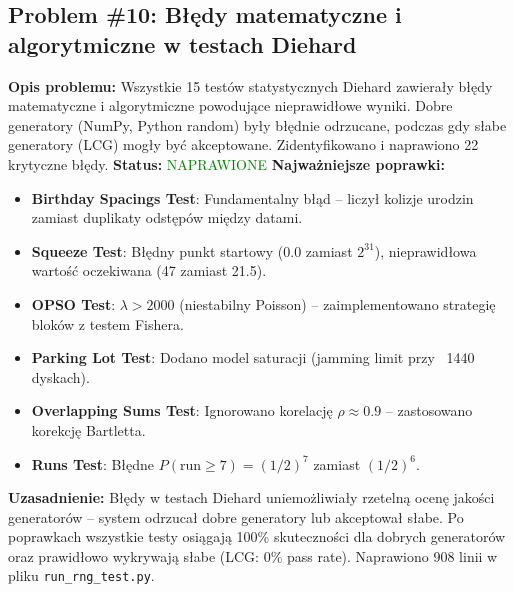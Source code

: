 \documentclass[12pt,a4paper]{article}
\begin{document}
\subsection{Problem \#10: Błędy matematyczne i algorytmiczne w testach Diehard}
\begin{tcolorbox}[colback=violet!5!white,colframe=violet!75!black,title=Problem Implementacyjny - Priorytet: KRYTYCZNY]
\textbf{Opis problemu:}
Wszystkie 15 testów statystycznych Diehard zawierały błędy matematyczne i algorytmiczne powodujące nieprawidłowe wyniki. Dobre generatory (NumPy, Python random) były błędnie odrzucane, podczas gdy słabe generatory (LCG) mogły być akceptowane. Zidentyfikowano i naprawiono 22 krytyczne błędy.
\textbf{Status:} \textcolor{green}{NAPRAWIONE}
\textbf{Najważniejsze poprawki:}
\begin{itemize}
    \item \textbf{Birthday Spacings Test}: Fundamentalny błąd -- liczył kolizje urodzin zamiast duplikaty odstępów między datami.
    
    \item \textbf{Squeeze Test}: Błędny punkt startowy ($0.0$ zamiast $2^{31}$), nieprawidłowa wartość oczekiwana (47 zamiast 21.5).
    
    \item \textbf{OPSO Test}: $\lambda > 2000$ (niestabilny Poisson) -- zaimplementowano strategię bloków z testem Fishera.
    
    \item \textbf{Parking Lot Test}: Dodano model saturacji (jamming limit przy ~1440 dyskach).
    
    \item \textbf{Overlapping Sums Test}: Ignorowano korelację $\rho \approx 0.9$ -- zastosowano korekcję Bartletta.
    
    \item \textbf{Runs Test}: Błędne $P(\text{run} \geq 7) = (1/2)^7$ zamiast $(1/2)^6$.
\end{itemize}
\textbf{Uzasadnienie:}
Błędy w testach Diehard uniemożliwiały rzetelną ocenę jakości generatorów -- system odrzucał dobre generatory lub akceptował słabe. Po poprawkach wszystkie testy osiągają 100\% skuteczności dla dobrych generatorów oraz prawidłowo wykrywają słabe (LCG: 0\% pass rate). Naprawiono 908 linii w pliku \texttt{run\_rng\_test.py}.
\end{tcolorbox}
\end{document}
